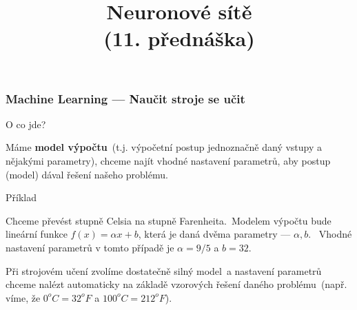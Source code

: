 \documentclass[red,professionalfont]{beamer}
\title[]{Neuronové sítě\\ (11. přednáška)}
\date[]{}
\theoremstyle{definition}
\newcommand{\0}{\mbox{${\bf 0}$}}
\renewcommand{\emph}[1]{{\bf #1}}
\begin{document}



\begin{frame}{} \titlepage
\end{frame}

\begin{frame}\frametitle{Machine Learning --- Naučit stroje se učit}
\alert{O co jde?}\pause

Máme \emph{model výpočtu}\pause\ (t.j. výpočetní postup jednoznačně daný
vstupy a nějakými parametry)\pause, chceme najít vhodné nastavení parametrů,
aby postup (model) dával řešení našeho problému.\pause

\vskip0.3cm
\alert{Příklad}

 Chceme převést stupně Celsia na stupně Farenheita.\pause\
 Modelem výpočtu bude lineární funkce $f(x) = \alpha x + b$\pause, která je daná dvěma
 parametry --- $\alpha, b$. \pause\ Vhodné nastavení parametrů v tomto případě je $\alpha=9/5$ a $b=32$.\pause\

\vskip0.3cm
Při strojovém učení zvolíme dostatečně silný model\pause\ a nastavení parametrů chceme nalézt automaticky na základě vzorových řešení
daného problému\pause\ (např. víme, že $0^oC = 32^oF$ a $100^o C = 212^o F$).\pause

\end{frame}
\end{document}
